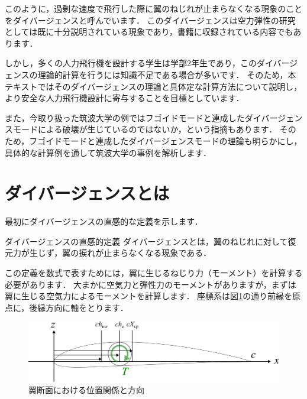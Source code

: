 \documentclass{jarticle}
\begin{document}
このように，過剰な速度で飛行した際に翼のねじれが止まらなくなる現象のことをダイバージェンスと呼んでいます．
このダイバージェンスは空力弾性の研究としては既に十分説明されている現象であり，書籍に収録されている内容でもあります\cite{2019}．

しかし，多くの人力飛行機を設計する学生は学部2年生であり，このダイバージェンスの理論的計算を行うには知識不足である場合が多いです．
そのため，本テキストではそのダイバージェンスの理論と具体定な計算方法について説明し，より安全な人力飛行機設計に寄与することを目標としています．

また，今取り扱った筑波大学の例ではフゴイドモードと連成したダイバージェンスモード\cite{takasaki}による破壊が生じているのではないか，という指摘もあります．
そのため，フゴイドモードと連成したダイバージェンスモードの理論も明らかにし，具体的な計算例を通して筑波大学の事例を解析します．

\newpage

\section{ダイバージェンスとは}

最初にダイバージェンスの直感的な定義を示します．
\begin{itembox}[l]{ダイバージェンスの直感的定義}
    ダイバージェンスとは，翼のねじれに対して復元力が生じず，翼の捩れが止まらなくなる現象である．
\end{itembox}

この定義を数式で表すためには，翼に生じるねじり力（モーメント）を計算する必要があります．
大まかに空気力と弾性力のモーメントがありますが，まずは翼に生じる空気力によるモーメントを計算します．
座標系は図\ref{chod}の通り前縁を原点に，後縁方向に軸をとります．
\begin{figure}[H]
    \centering
    \includegraphics[width=0.7\linewidth]{image/airfoil.pdf}
    \caption{翼断面における位置関係と方向}
    \label{chod}
\end{figure}
\end{document}
